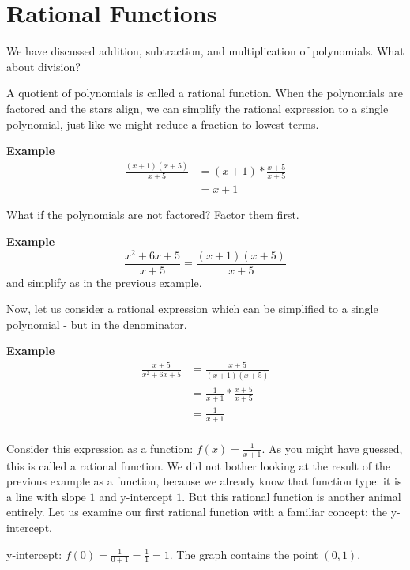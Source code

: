 \chapter{Rational Functions}

We have discussed addition, subtraction, and multiplication of polynomials. What about division?

A quotient of polynomials is called a rational function. When the polynomials are factored and the stars align, we can simplify the rational expression to a single polynomial, just like we might reduce a fraction to lowest terms.

\textbf{Example} 
\begin{equation} \label{eq1}
\begin{split}
\frac{(x + 1)(x + 5)}{x + 5} & = (x + 1) * \frac{x+5}{x+5} \\
& = x + 1
\end{split}
\end{equation}

What if the polynomials are not factored? Factor them first.

\textbf{Example} 
\[ \frac{x^2 + 6x + 5}{x + 5} = \frac{(x + 1)(x + 5)}{x + 5} \]
and simplify as in the previous example.

Now, let us consider a rational expression which can be simplified to a single polynomial - but in the denominator.

\textbf{Example}
\begin{equation} \label{eq1}
\begin{split}
\frac{x + 5}{x^2 + 6x + 5} & = \frac{x + 5}{(x + 1)(x + 5)} \\
& = \frac{1}{x+1} * \frac{x+5}{x+5} \\
& = \frac{1}{x+1} \\
\end{split}
\end{equation}

Consider this expression as a function: \( f(x) = \frac{1}{x+1} \). As you might have guessed, this is called a rational function. We did not bother looking at the result of the previous example as a function, because we already know that function type: it is a line with slope \( 1 \) and y-intercept \( 1 \). But this rational function is another animal entirely. Let us examine our first rational function with a familiar concept: the y-intercept.

y-intercept: \( f(0) = \frac{1}{0 + 1} = \frac{1}{1} = 1 \). The graph contains the point \( (0, 1) \).

